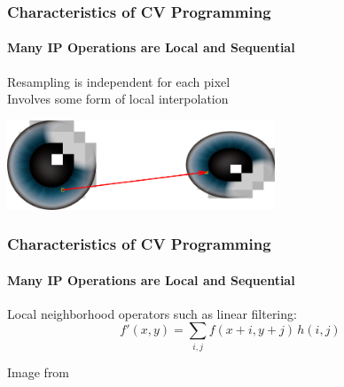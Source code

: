 \documentclass[xetex,professionalfont]{beamer}
\begin{document}

\begin{frame}
\frametitle{Characteristics of CV Programming}
\framesubtitle{Many IP Operations are Local and Sequential}

Resampling is independent for each pixel\\\medskip
Involves some form of local interpolation

\bigskip
\begin{center}
	\includegraphics[width=8cm]{figures/resampling.png}
\end{center}

\end{frame}


\begin{frame}
\frametitle{Characteristics of CV Programming}
\framesubtitle{Many IP Operations are Local and Sequential}

Local neighborhood operators such as linear filtering:
\[
 f'(x,y)=\sum_{i,j}f(x+i,y+j)\,h(i,j)
\]

\medskip
\begin{center}
	{\centering Image from \cite{prince12}}
\end{center}

\end{frame}

\end{document}
